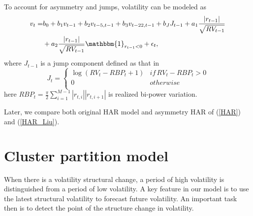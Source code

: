 \documentclass[preprint,12pt,authoryear]{elsarticle}
\begin{document}
To account for asymmetry and jumps, volatility can be modeled as
\begin{align}\label{HAR_Liu}
	v_t=&b_0+b_1v_{t-1}+b_2v_{t-5,t-1}+b_3v_{t-22,t-1}+b_JJ_{t-1}+a_{1}\frac{|r_{t-1}|}{\sqrt{RV_{t-1}}}\notag\\
	&+a_{2}\frac{|r_{t-1}|}{\sqrt{RV_{t-1}}}\mathbbm{1}_{r_{t-1}<0} +\epsilon_t,
\end{align}
where $J_{t-1}$ is a jump component defined as that in \cite{Liu2008}
\begin{equation*}
	J_t=\left\{
	\begin{matrix}
		\log(RV_t-RBP_t+1) & if \, RV_t-RBP_t>0 \\
		0 & otherwise \\
	\end{matrix}
	\right.
\end{equation*}
here $RBP_t=\frac\pi2\sum_{i=1}^{M-1}|r_{t,i}||r_{t,i+1}|$ is realized bi-power variation.

Later, we compare both original HAR model and asymmetry HAR of (\ref{HAR}) and (\ref{HAR_Liu}).

\section{Cluster partition model}

When there is a volatility structural change, a period of high volatility is distinguished from a period of low volatility. A key feature in our model is to use the latest structural volatility to forecast future volatility. An important task then is to detect the point of the structure change in volatility.
\end{document}
